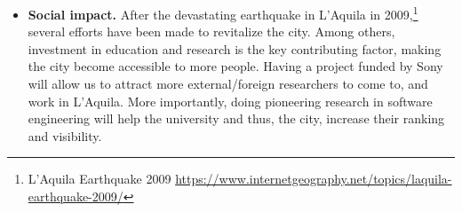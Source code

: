 \begin{itemize}
	\item \textbf{Social impact.} After the devastating earthquake in L'Aquila in 2009,\footnote{L'Aquila Earthquake 2009 \url{https://www.internetgeography.net/topics/laquila-earthquake-2009/}} several efforts have been made to revitalize the city. Among others, investment in education and research is the key contributing factor, making the city become accessible to more people.
	Having a project funded by Sony will allow us %
	to attract more external/foreign researchers to come to, and work in L'Aquila. More importantly, doing pioneering research %
	in software engineering will help the university and thus, the city, increase their ranking and visibility. %
	
	

\end{itemize}
\vspace{-.4cm}







